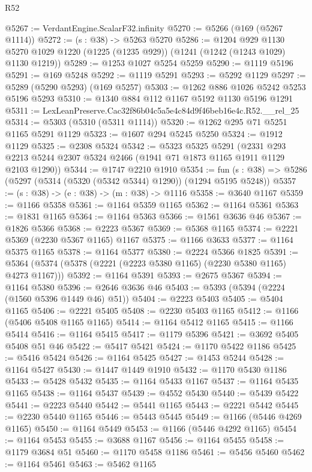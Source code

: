 \begin{lexlean}{R52}
\begin{coremodule}
@5267 := VerdantEngine.ScalarF32.infinity
@5270 := @5266 (@169 (@5267 @1114))
@5272 := (s : @38) -> @5263 @5270
@5286 := @1204
    @929
    @1130
    @5270
    @1029
    @1220
    (@1225 (@1235 @929))
    (@1241 (@1242 (@1243 @1029) @1130 @1219))
@5289 := @1253 @1027 @5254 @5259
@5290 := @1119 @5196
@5291 := @169 @5248
@5292 := @1119 @5291
@5293 := @5292 @1129
@5297 := @5289 (@5290 @5293) (@169 @5257)
@5303 := @1262 @886 @1026 @5242 @5253 @5196 @5293
@5310 := @1340 @884 @112 @1167 @5192 @1130 @5196 @1291
@5311 := LexLeanPreserve.Cac32f86b04c5a5e4c84d9f46beb16e4c.R52.__rel_25
@5314 := @5303 (@5310 (@5311 @1114))
@5320 := @1262 @295 @71 @5251 @1165 @5291 @1129
@5323 := @1607 @294 @5245 @5250
@5324 := @1912 @1129
@5325 := @2308 @5324
@5342 := @5323
    @5325
    @5291
    (@2331 @293 @2213 @5244 @2307 @5324 @2466 (@1941 @71 @1873 @1165 @1911 @1129 @2103 @1290))
@5344 := @1747 @2210 @1910
@5354 := fun (s : @38) => @5286 (@5297 (@5314 (@5320 (@5342 @5344) @1290)) (@1294 @5195 @5248))
@5357 := (s : @38) -> (e : @38) -> (m : @38) -> @1116
@5358 := @3640 @1167
@5359 := @1166 @5358
@5361 := @1164 @5359 @1165
@5362 := @1164 @5361
@5363 := @1831 @1165
@5364 := @1164 @5363
@5366 := @1561 @3636 @46
@5367 := @1826 @5366
@5368 := @2223 @5367
@5369 := @5368 @1165
@5374 := @2221 @5369 (@2230 @5367 @1165) @1167
@5375 := @1166 @3633
@5377 := @1164 @5375 @1165
@5378 := @1164 @5377
@5380 := @2224 @5366 @1825
@5391 := @5364 (@5374 (@5378 (@2221 (@2223 @5380 @1165) (@2230 @5380 @1165) @4273 @1167)))
@5392 := @1164 @5391
@5393 := @2675 @5367
@5394 := @1164 @5380
@5396 := @2646 @3636 @46
@5403 := @5393 (@5394 (@2224 (@1560 @5396 @1449 @46) @51))
@5404 := @2223 @5403
@5405 := @5404 @1165
@5406 := @2221 @5405
@5408 := @2230 @5403 @1165
@5412 := @1166 (@5406 @5408 @1165 @1165)
@5414 := @1164 @5412 @1165
@5415 := @1166 @5414
@5416 := @1164 @5415
@5417 := @1179 @5396
@5421 := @3692 @5405 @5408 @51 @46
@5422 := @5417 @5421
@5424 := @1170 @5422 @1186
@5425 := @5416 @5424
@5426 := @1164 @5425
@5427 := @1453 @5244
@5428 := @1164 @5427
@5430 := @1447 @1449 @1910
@5432 := @1170 @5430 @1186
@5433 := @5428 @5432
@5435 := @1164 @5433 @1167
@5437 := @1164 @5435 @1165
@5438 := @1164 @5437
@5439 := @4552 @5430
@5440 := @5439 @5422
@5441 := @2223 @5440
@5442 := @5441 @1165
@5443 := @2221 @5442
@5445 := @2230 @5440 @1165
@5446 := @5443 @5445
@5449 := @1166 (@5446 @4269 @1165)
@5450 := @1164 @5449
@5453 := @1166 (@5446 @4292 @1165)
@5454 := @1164 @5453
@5455 := @3688 @1167
@5456 := @1164 @5455
@5458 := @1179 @3684 @51
@5460 := @1170 @5458 @1186
@5461 := @5456 @5460
@5462 := @1164 @5461
@5463 := @5462 @1165

\end{coremodule}
\end{lexlean}
